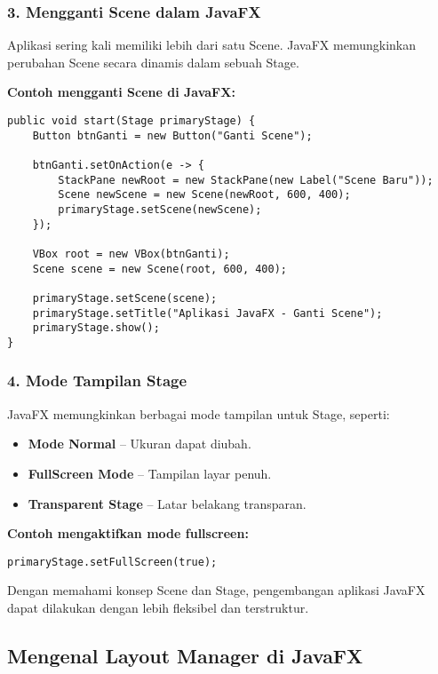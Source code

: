 \subsubsection{3. Mengganti Scene dalam JavaFX}
Aplikasi sering kali memiliki lebih dari satu Scene. JavaFX memungkinkan perubahan Scene secara dinamis dalam sebuah Stage.

\textbf{Contoh mengganti Scene di JavaFX:}
\begin{lstlisting}[style=JavaStyle, caption=Mengubah Scene dalam JavaFX]
public void start(Stage primaryStage) {
	Button btnGanti = new Button("Ganti Scene");
	
	btnGanti.setOnAction(e -> {
		StackPane newRoot = new StackPane(new Label("Scene Baru"));
		Scene newScene = new Scene(newRoot, 600, 400);
		primaryStage.setScene(newScene);
	});
	
	VBox root = new VBox(btnGanti);
	Scene scene = new Scene(root, 600, 400);
	
	primaryStage.setScene(scene);
	primaryStage.setTitle("Aplikasi JavaFX - Ganti Scene");
	primaryStage.show();
}
\end{lstlisting}


\subsubsection{4. Mode Tampilan Stage}
JavaFX memungkinkan berbagai mode tampilan untuk Stage, seperti:
\begin{itemize}
\item \textbf{Mode Normal} – Ukuran dapat diubah.
\item \textbf{FullScreen Mode} – Tampilan layar penuh.
\item \textbf{Transparent Stage} – Latar belakang transparan.
\end{itemize}

\textbf{Contoh mengaktifkan mode fullscreen:}
\begin{lstlisting}[style=JavaStyle, caption=Mengaktifkan mode layar penuh dalam JavaFX]
primaryStage.setFullScreen(true);
\end{lstlisting}

Dengan memahami konsep Scene dan Stage, pengembangan aplikasi JavaFX dapat dilakukan dengan lebih fleksibel dan terstruktur.

\subsection{Mengenal Layout Manager di JavaFX}

